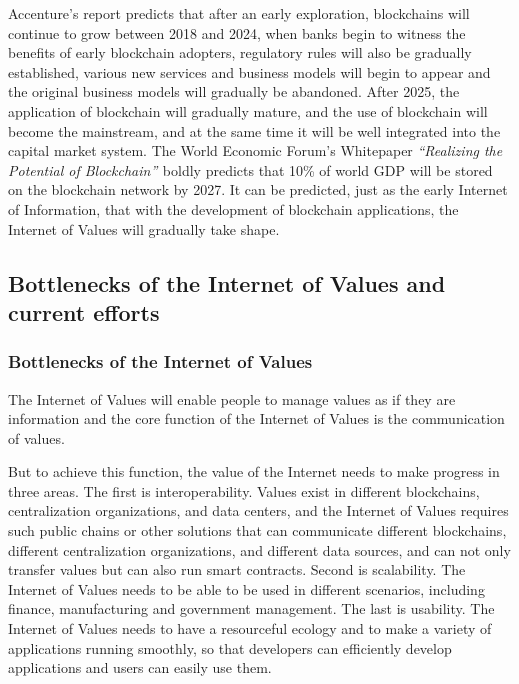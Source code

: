 \documentclass[a4paper,12pt]{article}
\begin{document}
Accenture's report \citeyearpar{Accenture} predicts that after an early exploration, blockchains will continue to grow between 2018 and 2024, when banks begin to witness the benefits of early blockchain adopters, regulatory rules will also be gradually established, various new services and business models will begin to appear and the original business models will gradually be abandoned. After 2025, the application of blockchain will gradually mature, and the use of blockchain will become the mainstream, and at the same time it will be well integrated into the capital market system. The World Economic Forum's Whitepaper \textit{“Realizing the Potential of Blockchain” } \citeyearpar{Worldeconomyforum} boldly predicts that 10\% of world GDP will be stored on the blockchain network by 2027. It can be predicted, just as the early Internet of Information, that with the development of blockchain applications, the Internet of Values will gradually take shape.

\subsection{Bottlenecks of the Internet of Values and current efforts}

\subsubsection{Bottlenecks of the Internet of Values}

The Internet of Values will enable people to manage values as if they are information and the core function of the Internet of Values is the communication of values.

But to achieve this function, the value of the Internet needs to make progress in three areas. The first is interoperability. Values exist in different blockchains, centralization organizations, and data centers, and the Internet of Values requires such public chains or other solutions that can communicate different blockchains, different centralization organizations, and different data sources, and can not only transfer values but can also run smart contracts. Second is scalability. The Internet of Values needs to be able to be used in different scenarios, including finance, manufacturing and government management. The last is usability. The Internet of Values needs to have a resourceful ecology and to make a variety of applications running smoothly, so that developers can efficiently develop applications and users can easily use them.
\end{document}
